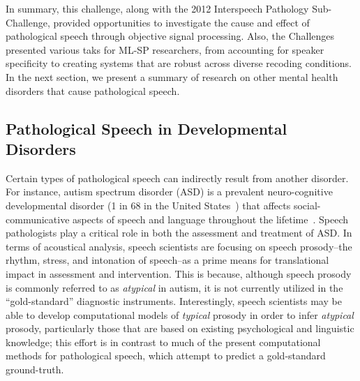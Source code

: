 \documentclass{article}
\begin{document}
In summary, this challenge, along with the 2012 Interspeech Pathology Sub-Challenge, provided opportunities to investigate the cause and effect of pathological speech through objective signal processing. Also, the Challenges presented various taks for ML-SP researchers, from accounting for speaker specificity to creating systems that are robust across diverse recoding conditions. In the next section, we present a summary of research on other mental health disorders that cause pathological speech.

\subsection{Pathological Speech in Developmental Disorders}
Certain types of pathological speech can indirectly result from another disorder. For instance, autism spectrum disorder (ASD) is a prevalent neuro-cognitive developmental disorder (1 in 68 in the United States~\cite{baio2014prevalence}) that affects social-communicative aspects of speech and language throughout the lifetime~\cite{american2013diagnostic}. Speech pathologists play a critical role in both the assessment and treatment of ASD. In terms of acoustical analysis, speech scientists are focusing on speech prosody--the rhythm, stress, and intonation of speech--as a prime means for translational impact in assessment and intervention. This is because, although speech prosody is commonly referred to as {\it atypical} in autism, it is not currently utilized in the ``gold-standard'' diagnostic instruments. Interestingly, speech scientists may be able to develop computational models of {\it typical} prosody in order to infer {\it atypical} prosody, particularly those that are based on existing psychological and linguistic knowledge; this effort is in contrast to much of the present computational methods for pathological speech, which attempt to predict a gold-standard ground-truth.
\end{document}
